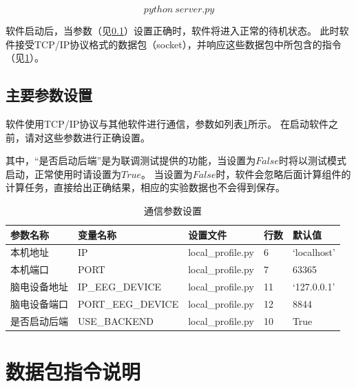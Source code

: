 \documentclass[UTF8]{article}
\begin{document}
\begin{equation*}
    python \ server.py
\end{equation*}

软件启动后，当参数（见\ref{subsection:Params}）设置正确时，软件将进入正常的待机状态。
此时软件接受TCP/IP协议格式的数据包（socket），并响应这些数据包中所包含的指令（见\ref{subsection:Socket}）。

\subsection{主要参数设置}
\label{subsection:Params}

软件使用TCP/IP协议与其他软件进行通信，参数如列表\ref{table:IPparams}所示。
在启动软件之前，请对这些参数进行正确设置。

其中，``是否启动后端''是为联调测试提供的功能，当设置为$False$时将以测试模式启动，正常使用时请设置为$True$。
当设置为$False$时，软件会忽略后面计算组件的计算任务，直接给出正确结果，相应的实验数据也不会得到保存。

\begin{table}[h!]
    \begin{center}
        \caption{通信参数设置}
        \label{table:IPparams}
        \begin{tabular}{|l|l|l|l|l|}
            \hline
            参数名称     & 变量名称          & 设置文件          & 行数 & 默认值      \\
            \hline
            本机地址     & IP                & local\_profile.py & 6    & `localhost' \\
            本机端口     & PORT              & local\_profile.py & 7    & 63365       \\
            脑电设备地址 & IP\_EEG\_DEVICE   & local\_profile.py & 11   & `127.0.0.1' \\
            脑电设备端口 & PORT\_EEG\_DEVICE & local\_profile.py & 12   & 8844        \\
            是否启动后端 & USE\_BACKEND      & local\_profile.py & 10   & True        \\
            \hline
        \end{tabular}
    \end{center}
\end{table}

\section{数据包指令说明}
\label{subsection:Socket}
\end{document}
